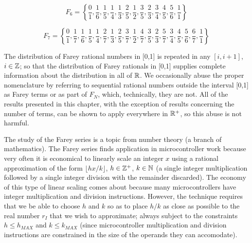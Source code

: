 \begin{equation}
\label{eq:cfry0:sint:eq0001f}
F_6  = \left\{ {\frac{0}{1},\frac{1}{6},\frac{1}{5},
                \frac{1}{4},
                \frac{1}{3},\frac{2}{5},\frac{1}{2},
                \frac{3}{5},\frac{2}{3},
                \frac{3}{4},
                \frac{4}{5},
                \frac{5}{6},\frac{1}{1}} \right\}
\end{equation}


\begin{equation}
\label{eq:cfry0:sint:eq0001g}
F_7  = \left\{ {\frac{0}{1},\frac{1}{7},\frac{1}{6},\frac{1}{5},
                \frac{1}{4},\frac{2}{7},
                \frac{1}{3},\frac{2}{5},\frac{3}{7},\frac{1}{2},
                \frac{4}{7},\frac{3}{5},\frac{2}{3},
                \frac{5}{7},\frac{3}{4},
                \frac{4}{5},
                \frac{5}{6},\frac{6}{7},\frac{1}{1} } \right\}
\end{equation}


The distribution of Farey rational numbers in
[0,1] is repeated
in any
$[i,i+1]$, $i\in {\mathbb{Z}}$; so that the distribution of
Farey rationals in [0,1] supplies complete
information about the distribution in
all of ${\mathbb{R}}$.  We
occasionally abuse the proper nomenclature by referring
to sequential rational numbers outside the
interval [0,1] as Farey terms or as part of
$F_N$, which, technically, they are not.
All of the results presented in
this chapter, with the exception of results concerning the number
of terms, can be shown to apply
everywhere in ${\mathbb{R}^+}$, so this abuse
is not harmful.

The study of the Farey series is a topic from number theory
(a branch of mathematics).  The Farey series finds application
in microcontroller work because very often it is economical
to linearly scale an integer $x$ using a rational approximation
of the form $\lfloor hx/k \rfloor$, $h \in {\mathbb{Z}^+}$,
$k \in {\mathbb{N}}$ (a single integer multiplication followed by
a single integer division with the remainder discarded).
The economy of this type of linear scaling comes about because
many microcontrollers have integer multiplication and division
instructions.  However, the technique requires that we be
able to choose $h$ and $k$ so as to place $h/k$ as close
as possible to the real number $r_I$ that we wish to
approximate; always subject to the constraints
$h \leq{} h_{MAX}$ and $k \leq k_{MAX}$ (since microcontroller
multiplication and division instructions are constrained in
the size of the operands they can accomodate).


